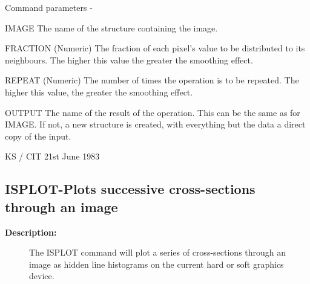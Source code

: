 \begin{description}
\begin{description}
\begin{terminalv}
 Command parameters -

 IMAGE    The name of the structure containing the image.

 FRACTION (Numeric) The fraction of each pixel's value to be
          distributed to its neighbours.  The higher this
          value the greater the smoothing effect.

 REPEAT   (Numeric) The number of times the operation is to
          be repeated.  The higher this value, the greater
          the smoothing effect.

 OUTPUT   The name of the result of the operation.  This can
          be the same as for IMAGE.  If not, a new structure
          is created, with everything but the data a direct
          copy of the input.

                                  KS / CIT 21st June 1983
\end{terminalv}
\end{description}
\subsection{ISPLOT-\label{ISPLOT}Plots successive cross-sections through an image}
\begin{description}

\item [\textbf{Description:}]
 The ISPLOT command will plot a series of cross-sections
 through an image as hidden line histograms on the current
 hard or soft graphics device.


\end{description}
\end{description}
